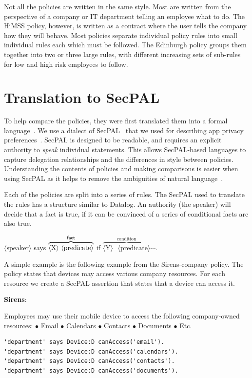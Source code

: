 \documentclass[conference,twocolumn]{IEEEtran}
\newenvironment{policyrule}[1]{%
  \begin{mdframed}[innerbottommargin=0]\footnotesize
    \noindent\textbf{\sffamily #1}:~\itshape%
  }{%
  \end{mdframed}
}
\begin{document}
Not all the policies are written in the same style.
Most are written from the perspective of a company or IT department telling an employee what to do.
The HiMSS policy, however, is written as a contract where the user tells the company how they will behave.
Most policies separate individual policy rules into small individual rules each which must be followed.
The Edinburgh policy groups them together into two or three large rules, with different increasing sets of sub-rules for low and high risk employees to follow.

\section{Translation to SecPAL}
\label{sec:translation_to_secpal}

To help compare the policies, they were first translated them into a formal language~\cite{hallett_specifying_2016}.
We use a dialect of SecPAL~\cite{becker_secpal:_2010} that we used for describing app privacy preferences~\cite{hallett_apppal_2016}.
SecPAL is designed to be readable, and requires an explicit authority to \emph{speak} individual statements.
This allows SecPAL-based languages to capture delegation relationships and the differences in style between policies.
Understanding the contents of policies and making comparisons is easier when using SecPAL as it helps to remove the ambiguities of natural language~\cite{hallett_specifying_2016}.

Each of the policies are split into a series of rules.
The SecPAL used to translate the rules has a structure similar to Datalog.
An authority (the speaker) will decide that a fact is true, if it can be convinced of a series of conditional facts are also true.

\begin{center}\ttfamily\footnotesize%
  \newcommand{\sptoken}[1]{$\langle\text{#1}\rangle$}
  \sptoken{speaker} says $\overbrace{\text{\sptoken{X} \sptoken{predicate}}}^{\text{\sf fact}}$ if $\overbrace{\text{\sptoken{Y} \sptoken{predicate}}}^{\text{condition}}\cdots$.
\end{center}

A simple example is the following example from the Sirens-company policy.
The policy states that devices may access various company resources.
For each resource we create a SecPAL assertion that states that a device can access it.
\begin{policyrule}{Sirens}
  Employees may use their mobile device to access the following company-owned resources:
  \newline $\bullet$ Email $\bullet$ Calendars $\bullet$ Contacts $\bullet$ Documents $\bullet$ Etc.
  \begin{lstlisting}
'department' says Device:D canAccess('email').
'department' says Device:D canAccess('calendars').
'department' says Device:D canAccess('contacts').
'department' says Device:D canAccess('documents').
  \end{lstlisting}
\end{policyrule}
\end{document}
